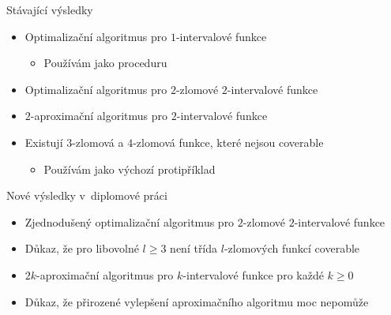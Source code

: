 \documentclass{beamer}
\theoremstyle{remark}
\begin{document}
\begin{frame}{Stávající výsledky}
\begin{itemize}
\item
Optimalizační algoritmus pro $1$-intervalové funkce \citep{Schieber2005154}
\begin{itemize}
\item Používám jako proceduru
\end{itemize}

\item
Optimalizační algoritmus pro $2$-zlomové $2$-intervalové funkce \citep{Dubovsky2012}

\item
$2$-aproximační algoritmus pro $2$-intervalové funkce \citep{Dubovsky2012}

\item Existují $3$-zlomová a $4$-zlomová funkce,
které nejsou coverable \citep{Dubovsky2012}
\begin{itemize}
\item Používám jako výchozí protipříklad
\end{itemize}
\end{itemize}
\end{frame}

\begin{frame}{Nové výsledky v~diplomové práci}
\begin{itemize}
\item Zjednodušený optimalizační algoritmus pro $2$-zlomové $2$-intervalové funkce
\item Důkaz, že pro libovolné $l \geq 3$ není třída $l$-zlomových funkcí coverable
\item $2k$-aproximační algoritmus pro $k$-intervalové funkce pro každé $k \geq 0$
\item Důkaz, že přirozené vylepšení aproximačního algoritmu moc nepomůže
\end{itemize}
\end{frame}
\end{document}
